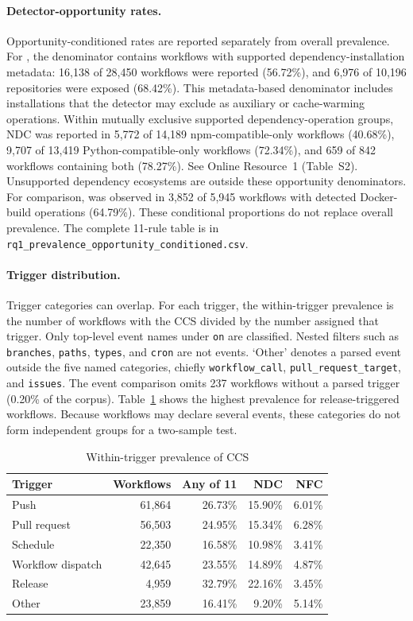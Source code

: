 \documentclass[smallextended]{svjour3}
\begin{document}
\paragraph{Detector-opportunity rates.}
Opportunity-conditioned rates are reported separately from overall prevalence. For , the denominator contains workflows with supported dependency-installation metadata: 16,138 of 28,450 workflows were reported (56.72\%), and 6,976 of 10,196 repositories were exposed (68.42\%). This metadata-based denominator includes installations that the detector may exclude as auxiliary or cache-warming operations. Within mutually exclusive supported dependency-operation groups, NDC was reported in 5,772 of 14,189 npm-compatible-only workflows (40.68\%), 9,707 of 13,419 Python-compatible-only workflows (72.34\%), and 659 of 842 workflows containing both (78.27\%). See Online Resource~1 (Table~S2). Unsupported dependency ecosystems are outside these opportunity denominators. For comparison,  was observed in 3,852 of 5,945 workflows with detected Docker-build operations (64.79\%). These conditional proportions do not replace overall prevalence. The complete 11-rule table is in \texttt{rq1\_prevalence\_opportunity\_conditioned.csv}.

\paragraph{Trigger distribution.}
Trigger categories can overlap. For each trigger, the within-trigger prevalence is the number of workflows with the CCS divided by the number assigned that trigger. Only top-level event names under \texttt{on} are classified. Nested filters such as \texttt{branches}, \texttt{paths}, \texttt{types}, and \texttt{cron} are not events. `Other' denotes a parsed event outside the five named categories, chiefly \texttt{workflow\_call}, \texttt{pull\_request\_target}, and \texttt{issues}. The event comparison omits 237 workflows without a parsed trigger (0.20\% of the corpus). Table~\ref{tab:trigger-distribution} shows the highest prevalence for release-triggered workflows. Because workflows may declare several events, these categories do not form independent groups for a two-sample test.
\begin{table}[htbp]\caption{Within-trigger prevalence of CCS}\label{tab:trigger-distribution}\centering\scriptsize\begin{tabular}{lrrrr}\hline
Trigger & Workflows & Any of 11 & NDC & NFC\\\hline
Push & 61,864 & 26.73\% & 15.90\% & 6.01\% \\
Pull request & 56,503 & 24.95\% & 15.34\% & 6.28\% \\
Schedule & 22,350 & 16.58\% & 10.98\% & 3.41\% \\
Workflow dispatch & 42,645 & 23.55\% & 14.89\% & 4.87\% \\
Release & 4,959 & 32.79\% & 22.16\% & 3.45\% \\
Other & 23,859 & 16.41\% & 9.20\% & 5.14\% \\\hline
\end{tabular}\end{table}
\end{document}
